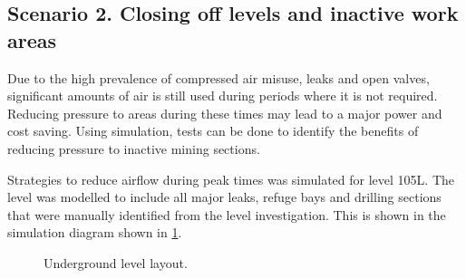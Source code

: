 	\subsection{Scenario 2. Closing off levels and inactive work areas}
	Due to the high prevalence of compressed air misuse, leaks and open valves, significant amounts of air is still used during periods where it is not required. Reducing pressure to areas during these times may lead to a major power and cost saving. Using simulation, tests can be done to identify the benefits of reducing pressure to inactive mining sections.
	\par 
	Strategies to reduce airflow during peak times was simulated for level 105L. The level was modelled to include all major leaks, refuge bays and drilling sections that were manually identified from the level investigation. This is shown in the simulation diagram shown in \cref{fig: KUS Simulation level layout}. 
	\begin{figure}[h!]
		\centering
		\caption{Underground level layout.}
		\label{fig: KUS Simulation level layout}
	\end{figure}	
